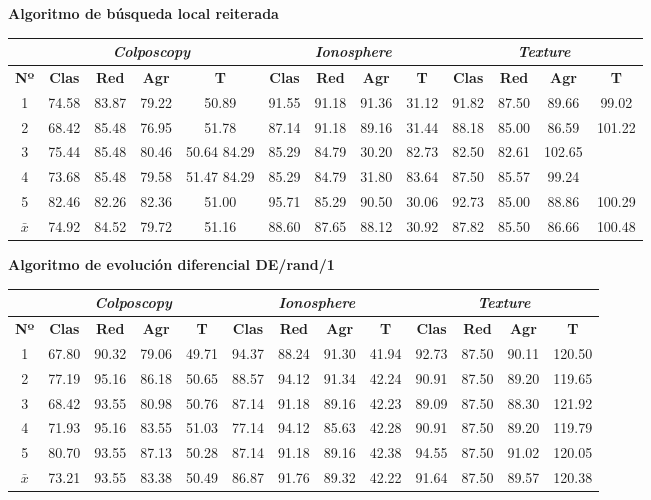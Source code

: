 \documentclass[12pt]{article}
\begin{document}
\newpage
\textbf{Algoritmo de búsqueda local reiterada}

\begin{table}[ht!]
\begin{tabular}{ccccc|cccc|cccc}
\centering
 & \multicolumn{4}{c}{\textit{Colposcopy}} & \multicolumn{4}{c}{\textit{Ionosphere}} & \multicolumn{4}{c}{\textit{Texture}} \\ \hline
\textbf{Nº} & \textbf{Clas} & \textbf{Red} & \textbf{Agr} & \textbf{T} & \textbf{Clas} & \textbf{Red} & \textbf{Agr} & \textbf{T} & \textbf{Clas} & \textbf{Red} & \textbf{Agr} & \textbf{T} \\ \hline
1 & 74.58 & 83.87 & 79.22 & 50.89 & 91.55 & 91.18 & 91.36 & 31.12 & 91.82 & 87.50 & 89.66 & 99.02\\
2 & 68.42 & 85.48 & 76.95 & 51.78 & 87.14 & 91.18 & 89.16 & 31.44 & 88.18 & 85.00 & 86.59 & 101.22\\
3 & 75.44 & 85.48 & 80.46 & 50.64 84.29 & 85.29 & 84.79 & 30.20 & 82.73 & 82.50 & 82.61 & 102.65\\
4 & 73.68 & 85.48 & 79.58 & 51.47 84.29 & 85.29 & 84.79 & 31.80 & 83.64 & 87.50 & 85.57 & 99.24\\
5 & 82.46 & 82.26 & 82.36 & 51.00 & 95.71 & 85.29 & 90.50 & 30.06 & 92.73 & 85.00 & 88.86 & 100.29\\
\hline 
$\bar{x}$  & 74.92 & 84.52 & 79.72 & 51.16  & 88.60 & 87.65 & 88.12 & 30.92  & 87.82 & 85.50 & 86.66 & 100.48
\end{tabular}
\end{table}

\textbf{Algoritmo de evolución diferencial DE/rand/1}

\begin{table}[ht!]
\begin{tabular}{ccccc|cccc|cccc}
\centering
 & \multicolumn{4}{c}{\textit{Colposcopy}} & \multicolumn{4}{c}{\textit{Ionosphere}} & \multicolumn{4}{c}{\textit{Texture}} \\ \hline
\textbf{Nº} & \textbf{Clas} & \textbf{Red} & \textbf{Agr} & \textbf{T} & \textbf{Clas} & \textbf{Red} & \textbf{Agr} & \textbf{T} & \textbf{Clas} & \textbf{Red} & \textbf{Agr} & \textbf{T} \\ \hline
1 & 67.80 & 90.32 & 79.06 & 49.71 & 94.37 & 88.24 & 91.30 & 41.94 & 92.73 & 87.50 & 90.11 & 120.50\\
2 & 77.19 & 95.16 & 86.18 & 50.65 & 88.57 & 94.12 & 91.34 & 42.24 & 90.91 & 87.50 & 89.20 & 119.65\\
3 & 68.42 & 93.55 & 80.98 & 50.76 & 87.14 & 91.18 & 89.16 & 42.23 & 89.09 & 87.50 & 88.30 & 121.92\\
4 & 71.93 & 95.16 & 83.55 & 51.03 & 77.14 & 94.12 & 85.63 & 42.28 & 90.91 & 87.50 & 89.20 & 119.79\\
5 & 80.70 & 93.55 & 87.13 & 50.28 & 87.14 & 91.18 & 89.16 & 42.38 & 94.55 & 87.50 & 91.02 & 120.05\\
\hline 
$\bar{x}$ & 73.21 & 93.55 & 83.38 & 50.49 & 86.87 & 91.76 & 89.32 & 42.22 & 91.64 & 87.50 & 89.57 & 120.38
\end{tabular}
\end{table}
\end{document}
